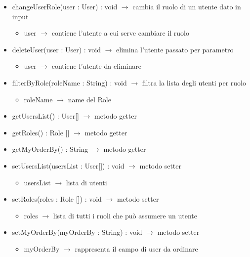 \begin{description}
\begin{itemize}
	\item changeUserRole(user  : User) : void $\rightarrow$ cambia il ruolo di un utente dato in input\begin{itemize}
		\item user  $\rightarrow$ contiene l'utente a cui serve cambiare il ruolo
	\end{itemize}
	
	\item deleteUser(user  : User) : void $\rightarrow$ elimina l'utente passato per parametro\begin{itemize}
		\item user  $\rightarrow$ contiene l'utente da eliminare 
	\end{itemize}
	
	\item filterByRole(roleName : String) : void $\rightarrow$ filtra la lista degli utenti per ruolo\begin{itemize}
		\item roleName $\rightarrow$ name del Role
	\end{itemize}
	
	\item getUsersList() : User[] $\rightarrow$ metodo getter
	\item getRoles() : Role [] $\rightarrow$ metodo getter
	\item getMyOrderBy() : String $\rightarrow$ metodo getter
	\item setUsersList(usersList : User[]) : void $\rightarrow$ metodo setter\begin{itemize}
		\item usersList $\rightarrow$ lista di utenti
	\end{itemize}
	
	\item setRoles(roles : Role []) : void $\rightarrow$ metodo setter\begin{itemize}
		\item roles $\rightarrow$ lista di tutti i ruoli che può assumere un utente
	\end{itemize}
	
	\item setMyOrderBy(myOrderBy : String) : void $\rightarrow$ metodo setter\begin{itemize}
		\item myOrderBy $\rightarrow$ rappresenta il campo di user da ordinare
	\end{itemize}
	
\end{itemize}

\end{description}

